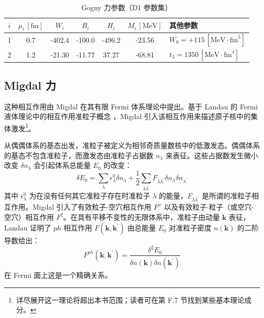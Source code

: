 \begin{table}[H]
\begin{centering}
\caption{\label{tab:Gogny=00529B=0053C2=006570}Gogny 力参数（D1 参数集）}
\par\end{centering}
\centering{}%
\begin{tabular}{ccccccl}
\hline 
$i$ & $\mu_{i}\,[\text{fm}]$ & $W_{i}$ & $B_{i}$ & $H_{i}$ & $M_{i}\,[\text{MeV}]$ & 其他参数\tabularnewline
\hline 
1 & 0.7 & -402.4 & -100.0 & -496.2 & -23.56 & $W_{0}=+115\,[\text{MeV}\cdot\text{fm}^{5}]$\tabularnewline
2 & 1.2 & -21.30 & -11.77 & 37.27 & -68.81 & $t_{3}=1350\,[\text{MeV}\cdot\text{fm}^{4}]$\tabularnewline
\hline 
\end{tabular}
\end{table}


\subsection{Migdal 力}

这种相互作用由 Migdal \cite{Mi67} 在其有限 Fermi 体系理论中提出。基于 Landau 的 Fermi 液体理论中的相互作用准粒子概念
\cite{La59}，Migdal 引入该相互作用来描述原子核中的集体激发\footnote{详尽展开这一理论将超出本书范围；读者可在第 F.7 节找到某些基本理论成分。}。

从偶偶体系的基态出发，准粒子被定义为相邻奇质量数核中的低激发态。偶偶体系的基态不包含准粒子，而激发态由准粒子占据数 $n_{\lambda}$
来表征。这些占据数发生微小改变 $\delta n_{\lambda}$ 会引起体系总能量 $E_{0}$ 的改变：
\begin{equation}
\delta E_{0}=\sum_{\lambda}\epsilon^{0}_{\lambda}\delta n_{\lambda}+\frac{1}{2}\sum_{\lambda\lambda^{\prime}}F_{\lambda\lambda^{\prime}}\delta n_{\lambda}\delta n_{\lambda^{\prime}}
\end{equation}
其中 $\epsilon^{0}_{\lambda}$ 为在没有任何其它准粒子存在时准粒子 $\lambda$ 的能量，$F_{\lambda\lambda^{\prime}}$
是所谓的准粒子相互作用。Migdal 引入了有效粒子-空穴相互作用 $F^{\omega}$ 以及有效粒子-粒子（或空穴-空穴）相互作用
$F^{\xi}$。在具有平移不变性的无限体系中，准粒子由动量 $\boldsymbol{k}$ 表征，Landau 证明了 $ph$
相互作用 $F(\boldsymbol{k},\boldsymbol{k}^{\prime})$ 由总能量 $E_{0}$ 对准粒子密度
$n(\boldsymbol{k})$ 的二阶导数给出：
\begin{equation}
F^{ph}(\boldsymbol{k},\boldsymbol{k}^{\prime})=\frac{\delta^{2}E_{0}}{\delta n(\boldsymbol{k})\delta n(\boldsymbol{k}^{\prime})}\label{eq:4.111}
\end{equation}
在 Fermi 面上这是一个精确关系。

